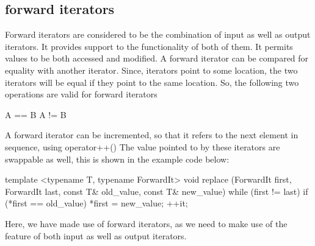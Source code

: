 \documentclass{report}
\begin{document}
\subsection*{forward iterators}
Forward iterators are considered to be the combination of input as well as output iterators. It provides support to the functionality of both of them. It permits values to be both accessed and modified.
\bigbreak \noindent
A forward iterator can be compared for equality with another iterator. Since, iterators point to some location, the two iterators will be equal if they point to the same location. So, the following two operations are valid for forward iterators
\begin{cppcode}
A == B
A != B
\end{cppcode}
\noindent A forward iterator can be incremented, so that it refers to the next element in sequence, using operator++()
\noindent The value pointed to by these iterators are swappable as well, this is shown in the example code below:
\begin{cppcode}
 template <typename T, typename ForwardIt> 
 void replace (ForwardIt first, ForwardIt last, const T& old_value, const T& new_value) {
   while (first != last) {
     if (*first == old_value) {
       *first = new_value;
     } ++it;
   }
 }
\end{cppcode}
\noindent Here, we have made use of forward iterators, as we need to make use of the feature of both input as well as output iterators.
\end{document}
